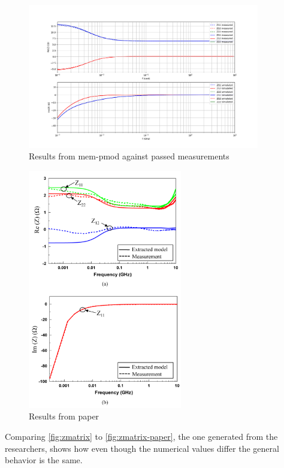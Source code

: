 \begin{figure}[htbp]
    \center
    \includegraphics[width = 0.9\textwidth]{img/zmatrix}
    \caption{Results from mem-pmod against passed measurements}
    \label{fig:zmatrix}
\end{figure}

\begin{figure}[htbp]
    \center
    \includegraphics[width = 0.6\textwidth]{img/zmatrix-paper}
    \caption{Results from paper}
    \label{fig:zmatrix-paper}
\end{figure}


Comparing \autoref{fig:zmatrix} to \autoref{fig:zmatrix-paper}, the one generated from the researchers, shows how even though the numerical values differ the general behavior is the same.
